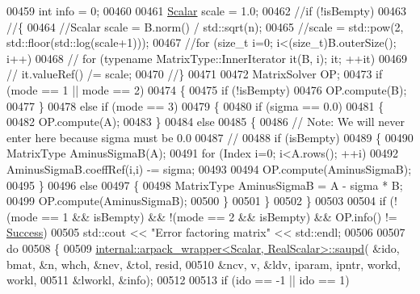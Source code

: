 \begin{DoxyCode}
00459   \textcolor{keywordtype}{int} info = 0;
00460 
00461   \hyperlink{class_eigen_1_1_arpack_generalized_self_adjoint_eigen_solver_ab1182405bfe87a505d4b7a8311c661ec}{Scalar} scale = 1.0;
00462   \textcolor{comment}{//if (!isBempty)}
00463   \textcolor{comment}{//\{}
00464   \textcolor{comment}{//Scalar scale = B.norm() / std::sqrt(n);}
00465   \textcolor{comment}{//scale = std::pow(2, std::floor(std::log(scale+1)));}
00467 \textcolor{comment}{}  \textcolor{comment}{//for (size\_t i=0; i<(size\_t)B.outerSize(); i++)}
00468   \textcolor{comment}{//    for (typename MatrixType::InnerIterator it(B, i); it; ++it)}
00469   \textcolor{comment}{//        it.valueRef() /= scale;}
00470   \textcolor{comment}{//\}}
00471 
00472   MatrixSolver OP;
00473   \textcolor{keywordflow}{if} (mode == 1 || mode == 2)
00474   \{
00475       \textcolor{keywordflow}{if} (!isBempty)
00476           OP.compute(B);
00477   \}
00478   \textcolor{keywordflow}{else} \textcolor{keywordflow}{if} (mode == 3)
00479   \{
00480       \textcolor{keywordflow}{if} (sigma == 0.0)
00481       \{
00482           OP.compute(A);
00483       \}
00484       \textcolor{keywordflow}{else}
00485       \{
00486           \textcolor{comment}{// Note: We will never enter here because sigma must be 0.0}
00487           \textcolor{comment}{//}
00488           \textcolor{keywordflow}{if} (isBempty)
00489           \{
00490             MatrixType AminusSigmaB(A);
00491             \textcolor{keywordflow}{for} (Index i=0; i<A.rows(); ++i)
00492                 AminusSigmaB.coeffRef(i,i) -= sigma;
00493             
00494             OP.compute(AminusSigmaB);
00495           \}
00496           \textcolor{keywordflow}{else}
00497           \{
00498               MatrixType AminusSigmaB = A - sigma * B;
00499               OP.compute(AminusSigmaB);
00500           \}
00501       \}
00502   \}
00503  
00504   \textcolor{keywordflow}{if} (!(mode == 1 && isBempty) && !(mode == 2 && isBempty) && OP.info() != 
      \hyperlink{group__enums_gga85fad7b87587764e5cf6b513a9e0ee5ea52581b035f4b59c203b8ff999ef5fcea}{Success})
00505       std::cout << \textcolor{stringliteral}{"Error factoring matrix"} << std::endl;
00506 
00507   \textcolor{keywordflow}{do}
00508   \{
00509     \hyperlink{struct_eigen_1_1internal_1_1arpack__wrapper}{internal::arpack\_wrapper<Scalar, RealScalar>::saupd}(
      &ido, bmat, &n, whch, &nev, &tol, resid, 
00510                                                         &ncv, v, &ldv, iparam, ipntr, workd, workl,
00511                                                         &lworkl, &info);
00512 
00513     \textcolor{keywordflow}{if} (ido == -1 || ido == 1)

\end{DoxyCode}
